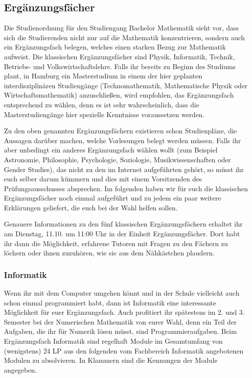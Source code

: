 
\subsection{Ergänzungsfächer}

Die Studienordnung für den Studiengang Bachelor Mathematik sieht vor, dass sich
die Studierenden nicht nur auf die Mathematik konzentrieren, sondern auch ein
Ergänzungsfach belegen, welches einen starken Bezug zur Mathematik aufweist.
Die klassischen Ergänzungsfächer sind Physik, Informatik, Technik, Betriebs-
und Volkswirtschaftslehre. Falls ihr bereits zu Beginn des Studiums plant, in
Hamburg ein Masterstudium in einem der hier geplanten interdisziplinären
Studiengänge (Technomathematik, Mathematische Physik oder
Wirtschaftsmathematik) anzuschließen, wird empfohlen, das Ergänzungsfach
entsprechend zu wählen, denn es ist sehr wahrscheinlich, dass die
Masterstudiengänge hier spezielle Kenntnisse voraussetzen werden.

Zu den oben genannten Ergänzungsfächern existieren schon Studienpläne, die
Aussagen darüber machen, welche Vorlesungen belegt werden müssen. Falls ihr
aber unbedingt ein anderes Ergänzungsfach wählen wollt (zum Beispiel
Astronomie, Philosophie, Psychologie, Soziologie, Musikwissenschaften oder
Gender Studies), das nicht zu den im Internet aufgeführten gehört, so müsst ihr
euch selber darum kümmern und dies mit einem Vorsitzenden des
Prüfungsausschusses absprechen. Im folgenden haben wir für euch die klassischen
Ergänzungsfächer noch einmal aufgeführt und zu jedem ein paar weitere
Erklärungen geliefert, die euch bei der Wahl helfen sollen.

Genauere Informationen zu den fünf klassischen Ergänzungsfächern erhaltet ihr
am Dienstag, 11.10. um 11:00 Uhr in der Einheit Ergänzungsfächer. Dort habt ihr
dann die Möglichkeit, erfahrene Tutoren mit Fragen zu den Fächern zu löchern
oder ihnen zuzuhören, wie sie aus dem Nähkästchen plaudern.

\subsubsection{Informatik}

Wenn ihr mit dem Computer umgehen könnt und in der Schule vielleicht auch schon
einmal programmiert habt, dann ist Informatik eine interessante Möglichkeit für
euer Ergänzungsfach. Auch profitiert ihr spätestens im 2. und 3.  Semester bei
der Numerischen Mathematik von eurer Wahl, denn ein Teil der Aufgaben, die ihr
für Numerik lösen müsst, sind Programmieraufgaben. Beim Ergänzungsfach
Informatik sind regelhaft Module im Gesamtumfang von (wenigstens) 24 LP aus den
folgenden vom Fachbereich Informatik angebotenen Modulen zu absolvieren. In
Klammern sind die Kennungen der Module angegeben.

